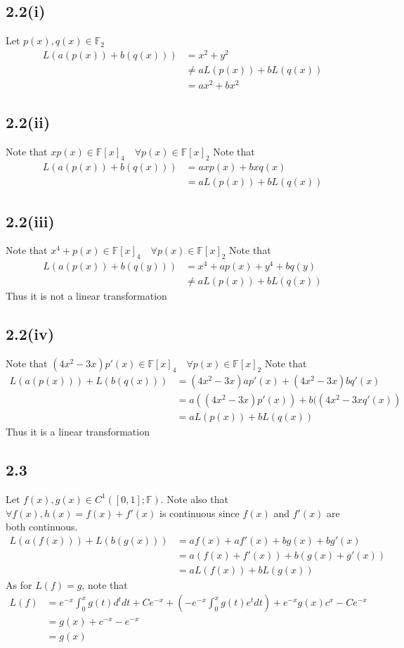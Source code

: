 \documentclass[letterpaper,12pt]{article}
\theoremstyle{definition}
\begin{document}
\subsection*{2.2(i)}
Let $p(x), q(x) \in \mathbb{F}_2$ 
\begin{align*}
L(a(p(x)) + b(q(x))) &= x^2 + y^2
\\&\neq aL(p(x)) + bL(q(x))
\\&= ax^2 + bx^2
\end{align*}
    
\subsection*{2.2(ii)}
Note that $xp(x) \in \mathbb{F} [x]_4 \quad \forall p(x) \in \mathbb{F} [x]_2$
Note that
\begin{align*}
L(a(p(x)) + b(q(x))) &= axp(x) + bxq(x)
\\&=aL(p(x)) + bL(q(x))
\end{align*}

\subsection*{2.2(iii)}
Note that $x^4 + p(x) \in \mathbb{F} [x]_4 \quad \forall p(x) \in \mathbb{F} [x]_2$
Note that
\begin{align*}
L(a(p(x)) + b(q(y))) &= x^4 + ap(x) + y^4 + bq(y)
\\&\neq aL(p(x)) + bL(q(x))
\end{align*}
Thus it is not a linear transformation

\subsection*{2.2(iv)}
Note that $(4x^2 - 3x)p'(x) \in \mathbb{F} [x]_4 \quad \forall p(x) \in \mathbb{F} [x]_2$
Note that
\begin{align*}
L(a(p(x))) + L(b(q(x))) &= (4x^2 - 3x)ap'(x) + (4x^2 - 3x)bq'(x)
\\&=a ( (4x^2 - 3x)p'(x)) + b( (4x^2 - 3xq'(x))
\\&=a L(p(x) ) + b L(q(x))
\end{align*}
Thus it is a linear transformation

\subsection*{2.3}
Let $f(x), g(x) \in C^1 ([0,1]; \mathbb{F} )$. Note also that $\forall f(x), h(x) = f(x) + f'(x)$ is continuous since $f(x)$ and $f'(x)$ are both continuous.
\begin{align*}
    L(a(f(x))) + L(b(g(x))) &= af(x) + af'(x) + bg(x) + bg'(x)
\\&=a(f(x) + f'(x)) + b(g(x) + g'(x))
\\&=aL(f(x)) + bL(g(x))
\end{align*}
As for $L(f) = g$, note that
\begin{align*}
    L(f) &= e^{-x} \int_0^xg(t)d^tdt + Ce^{-x} + (-e^{-x} \int_0^x g(t)e^tdt) + e^{-x}g(x)c^x - Ce^{-x}
    \\&=g(x) + c^{-x} - e^{-x}
\\&=g(x)
\end{align*}
\end{document}

